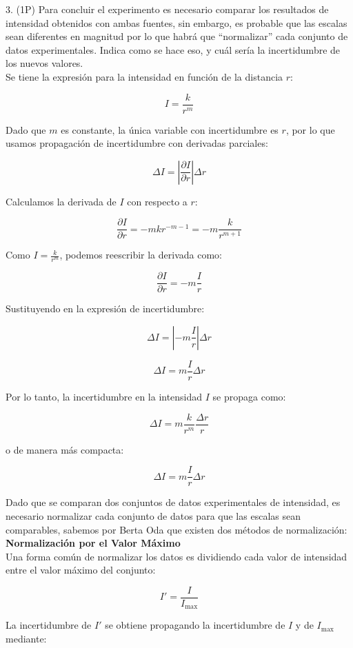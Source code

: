 \documentclass{article}
\theoremstyle{nonumberplain}
\begin{document}
3. (1P) Para concluir el experimento es necesario comparar los resultados de intensidad obtenidos con ambas fuentes, sin embargo, es probable que las escalas sean diferentes en magnitud por lo que habrá que “normalizar” cada conjunto de datos experimentales. Indica como se hace eso, y cuál sería la incertidumbre de los nuevos valores.\\


Se tiene la expresión para la intensidad en función de la distancia \( r \):  

\[
I = \frac{k}{r^m}
\]

Dado que \( m \) es constante, la única variable con incertidumbre es \( r \), por lo que usamos propagación de incertidumbre con derivadas parciales:

\[
\Delta I = \left| \frac{\partial I}{\partial r} \right| \Delta r
\]

Calculamos la derivada de \( I \) con respecto a \( r \):

\[
\frac{\partial I}{\partial r} = -m k r^{-m-1} = -m \frac{k}{r^{m+1}}
\]

Como \( I = \frac{k}{r^m} \), podemos reescribir la derivada como:

\[
\frac{\partial I}{\partial r} = -m \frac{I}{r}
\]

Sustituyendo en la expresión de incertidumbre:

\[
\Delta I = \left| -m \frac{I}{r} \right| \Delta r
\]

\[
\Delta I = m \frac{I}{r} \Delta r
\]

Por lo tanto, la incertidumbre en la intensidad \( I \) se propaga como:

\[
\Delta I = m \frac{k}{r^m} \frac{\Delta r}{r}
\]

o de manera más compacta:

\[
\Delta I = m \frac{I}{r} \Delta r
\]

Dado que se comparan dos conjuntos de datos experimentales de intensidad, es necesario normalizar cada conjunto de datos para que las escalas sean comparables, sabemos por Berta Oda que existen dos métodos de normalización: \\

\textbf{Normalización por el Valor Máximo}\\
Una forma común de normalizar los datos es dividiendo cada valor de intensidad entre el valor máximo del conjunto:

\[
I' = \frac{I}{I_{\max}}
\]

La incertidumbre de \( I' \) se obtiene propagando la incertidumbre de \( I \) y de \( I_{\max} \) mediante:
\end{document}
